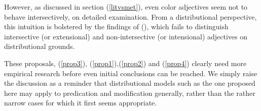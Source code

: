\documentclass[10pt,letterpaper,twocolumn]{article}
\begin{document}
However, as discussed in section (\ref{litvsmet}), even color adjectives seem not to behave intersectively, on detailed examination. From a distributional perspective, this intuition is bolstered by the findings of (\cite{boleda}), which fails to distinguish intersective (or extensional) and non-intersective (or intensional) adjectives on distributional grounds.

These proposals, (\ref{prop3}), (\ref{prop1}),(\ref{prop2}) and (\ref{prop4}) clearly need more empirical research before even initial conclusions can be reached. We simply raise the discussion as a reminder that distributional models such as the one proposed here may apply to predication and modification generally, rather than the rather narrow cases for which it first seems appropriate.








\end{document}
